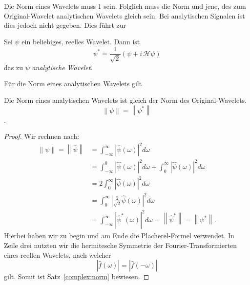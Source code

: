 \begin{refsection}
Die Norm eines Wavelets muss $1$ sein.
Folglich muss die Norm und jene, des zum Original-Wavelet analytischen Wavelets gleich sein.
Bei analytischen Signalen ist dies jedoch nicht gegeben.
Dies führt zur
\begin{definition}
	Sei $\psi$ ein beliebiges, reelles Wavelet. Dann ist
	\[
	\psi^\ast = \frac{1}{\sqrt{2}}\left(\psi + i\,\mathcal{H}\psi\right) 
	\]
	das zu $\psi$ \emph{analytische Wavelet}.
\end{definition}

Für die Norm eines analytischen Wavelets gilt
\begin{satz}
	\label{complex:norm}
	Die Norm eines analytischen Wavelets ist gleich der Norm des Original-Wavelets.
	\[\left\|\psi\right\| = \left\|\psi^\ast\right\|\].
\end{satz}

\begin{proof}
	Wir rechnen nach:
	\begin{align*}
		\left\|\psi\right\| = \left\|\hat{\psi}\right\|
		&= \int_{-\infty}^{\infty}\left|\hat{\psi}(\omega)\right|^2 d\omega \\
		&= \int_{-\infty}^{0}\left|\hat{\psi}(\omega)\right|^2 d\omega +  \int_{0}^{\infty}\left|\hat{\psi}(\omega)\right|^2 d\omega \\
		&=  2\int_{0}^{\infty}\left|\hat{\psi}(\omega)\right|^2 d\omega \\
		&=  \int_{0}^{\infty}\left|\frac{2}{\sqrt{2}}\hat{\psi}(\omega)\right|^2 d\omega \\
		&=  \int_{-\infty}^{\infty}\left|\hat{\psi}^\ast(\omega)\right|^2 d\omega 
		= \left\|\hat{\psi}^\ast\right\| = \left\|\psi^\ast\right\|.
	\end{align*}
	Hierbei haben wir zu begin und am Ende die Placherel-Formel verwendet.
	In Zeile drei nutzten wir die hermitesche Symmetrie der Fourier-Transformierten eines reellen Wavelets, nach welcher
	\[\left|\hat{f}(\omega)\right| = \left|\hat{f}(-\omega)\right|\]
	gilt.
	Somit ist Satz~\ref{complex:norm} bewiesen.
\end{proof}


\end{refsection}
